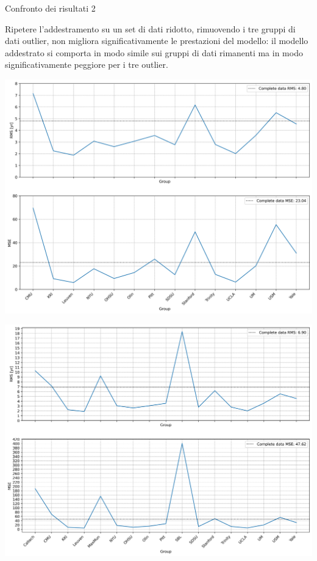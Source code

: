 \documentclass{beamer}
\begin{document}
\begin{frame}{Confronto dei risultati 2}

Ripetere l'addestramento su un set di dati ridotto, rimuovendo i tre gruppi di dati outlier, non migliora significativamente le prestazioni del modello: il modello addestrato si comporta in modo simile sui gruppi di dati rimanenti ma in modo significativamente peggiore per i tre outlier.

\begin{table}\centering
\begin{minipage}{0.45\textwidth}
	\includegraphics[width=\textwidth]{result_without_out.png}
\end{minipage}
\begin{minipage}{0.45\textwidth}
	\includegraphics[width=\textwidth]{result_without_out_overall.png}
\end{minipage}
\end{table}

\end{frame}
\end{document}

